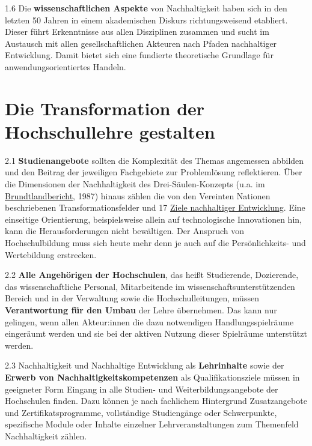 \documentclass[DIV=12]{scrartcl}
\begin{document}
1.6 Die \textbf{wissenschaftlichen Aspekte} von Nachhaltigkeit haben
sich in den letzten 50 Jahren in einem akademischen Diskurs
richtungsweisend etabliert. Dieser führt Erkenntnisse aus allen
Disziplinen zusammen und sucht im Austausch mit allen gesellschaftlichen
Akteuren nach Pfaden nachhaltiger Entwicklung. Damit bietet sich eine
fundierte theoretische Grundlage für anwendungsorientiertes Handeln.

\hypertarget{die-transformation-der-hochschullehre-gestalten}{%
\section{Die Transformation der Hochschullehre
gestalten}\label{die-transformation-der-hochschullehre-gestalten}}

2.1 \textbf{Studienangebote} sollten die Komplexität des Themas
angemessen abbilden und den Beitrag der jeweiligen Fachgebiete zur
Problemlösung reflektieren. Über die Dimensionen der Nachhaltigkeit des
Drei-Säulen-Konzepts (u.a. im
\href{https://sustainabledevelopment.un.org/content/documents/5987our-common-future.pdf}{Brundtlandbericht},
1987) hinaus zählen die von den Vereinten Nationen beschriebenen
Transformationsfelder und 17 \href{https://sdgs.un.org/goals}{Ziele
nachhaltiger Entwicklung}. Eine einseitige Orientierung, beispielsweise
allein auf technologische Innovationen hin, kann die Herausforderungen
nicht bewältigen. Der Anspruch von Hochschulbildung muss sich heute mehr
denn je auch auf die Persönlichkeits- und Wertebildung erstrecken.

2.2 \textbf{Alle Angehörigen der Hochschulen}, das heißt Studierende,
Dozierende, das wissenschaftliche Personal, Mitarbeitende im
wissenschaftsunterstützenden Bereich und in der Verwaltung sowie die
Hochschulleitungen, müssen \textbf{Verantwortung für den Umbau} der
Lehre übernehmen. Das kann nur gelingen, wenn allen Akteur:innen die
dazu notwendigen Handlungsspielräume eingeräumt werden und sie bei der
aktiven Nutzung dieser Spielräume unterstützt werden.

2.3 Nachhaltigkeit und Nachhaltige Entwicklung als \textbf{Lehrinhalte}
sowie der \textbf{Erwerb von Nachhaltigkeitskompetenzen} als
Qualifikationsziele müssen in geeigneter Form Eingang in alle Studien-
und Weiterbildungsangebote der Hochschulen finden. Dazu können je nach
fachlichem Hintergrund Zusatzangebote und Zertifikatsprogramme,
vollständige Studiengänge oder Schwerpunkte, spezifische Module oder
Inhalte einzelner Lehrveranstaltungen zum Themenfeld Nachhaltigkeit
zählen.
\end{document}
